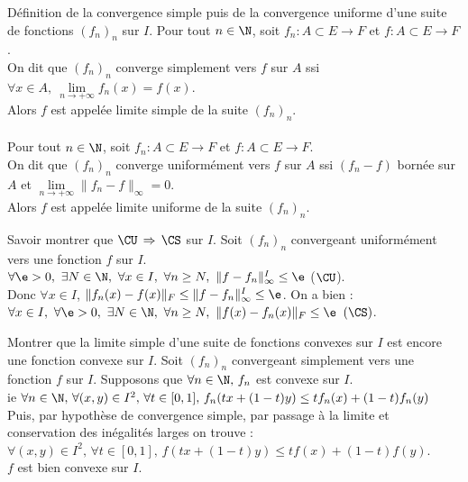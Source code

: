 \documentclass[french, 11pt]{article}
\begin{document}


\thispagestyle{fancy}

\begin{exercice}{}{}
    Définition de la convergence simple puis de la convergence uniforme d'une suite de fonctions $(f_n)_n$ sur $I$.
    \tcblower
    Pour tout $n\in\N$, soit $f_n:A\subset E \to F$ et $f:A\subset E \to F$.\\
    On dit que $(f_n)_n$ converge simplement vers $f$ sur $A$ ssi $\forall x \in A, ~ \lim\limits_{n\to+\infty} f_n(x) = f(x)$.\\
    Alors $f$ est appelée limite simple de la suite $(f_n)_n$.\\
    \\
    Pour tout $n\in\N$, soit $f_n:A\subset E \to F$ et $f:A\subset E \to F$.\\
    On dit que $(f_n)_n$ converge uniformément vers $f$ sur $A$ ssi $(f_n-f)$ bornée sur $A$ et $\lim\limits_{n\to+\infty} \|f_n - f\|_\infty = 0$.\\[-0.14cm]
    Alors $f$ est appelée limite uniforme de la suite $(f_n)_n$.
\end{exercice}

\begin{exercice}{}{}
    Savoir montrer que $\CU \, \Rightarrow \, \CS$ sur $I$.
    \tcblower
    Soit $(f_n)_n$ convergeant uniformément vers une fonction $f$ sur $I$.\\
    $\forall \e > 0, ~ \exists N \in \N, ~ \forall x \in I, ~ \forall n \geq N, ~ \|f - f_n\|_{\infty}^{I} \leq \e$ ($\CU$).\\
    Donc $\forall x \in I$, $\|f_n(x) - f(x)\|_F \le \|f - f_n\|_{\infty}^{I} \le \e$. On a bien :\\ 
    $\forall x \in I, ~ \forall \e > 0, ~ \exists N \in \N, ~ \forall n \geq N, ~ \|f(x) - f_n(x)\|_F\leq \e$ $(\CS)$.
\end{exercice}

\begin{exercice}{}{}
    Montrer que la limite simple d'une suite de fonctions convexes sur $I$ est encore une fonction convexe sur $I$.
    \tcblower
    Soit $(f_n)_n$ convergeant simplement vers une fonction $f$ sur $I$. Supposons que $\forall n \in \N, \, f_n$ est convexe sur $I$.\\
    ie $\forall n \in \N, \, \forall (x,y) \in I^2, \, \forall t \in [0, 1], \, f_n(tx + (1-t)y) \le tf_n(x) + (1-t)f_n(y)$\\
    Puis, par hypothèse de convergence simple, par passage à la limite et conservation des inégalités larges on trouve :\\
    $\forall (x,y) \in I^2, \, \forall t \in [0, 1], \, f(tx + (1-t)y) \le tf(x) + (1-t)f(y)$.\\
    $f$ est bien convexe sur $I$.
\end{exercice}
\end{document}
